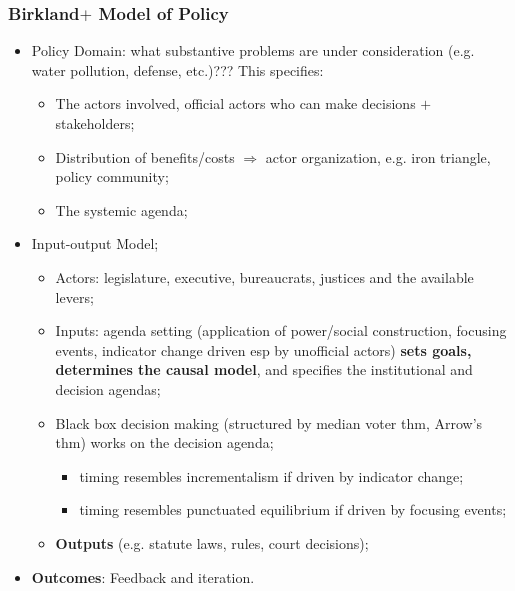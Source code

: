 \documentclass[aspectratio=169]{beamer}
\theoremstyle{principle}
\begin{document}
\begin{frame}
\frametitle{Birkland$+$ Model of Policy}
\begin{itemize}
\item Policy Domain: what substantive problems are under consideration (e.g. water pollution, defense, etc.)???  This specifies:
\begin{itemize}
\item The actors involved, official actors who can make decisions $+$ stakeholders; 
\item Distribution of benefits/costs $\Rightarrow$ actor organization, e.g. iron triangle, policy community;
\item The systemic agenda; 
\end{itemize}
\bigskip
\item \color{black}Input-output Model;
\begin{itemize}
\item Actors: legislature, executive, bureaucrats, justices and the available levers;
\item Inputs: agenda setting (application of power/social construction, focusing events, indicator change driven esp by unofficial actors) \textbf{sets goals, determines the causal model}, and specifies the institutional and decision agendas;
\item Black box decision making (structured by median voter thm, Arrow's thm) works on the decision agenda;
\begin{itemize}
\item timing resembles incrementalism if driven by indicator change;
\item timing resembles punctuated equilibrium if driven by focusing events;
 \end{itemize}
\item \textbf{Outputs} (e.g. statute laws, rules, court decisions);
\end{itemize}
\bigskip
\item \textbf{Outcomes}: Feedback and iteration.
\end{itemize}
\end{frame}
\end{document}
